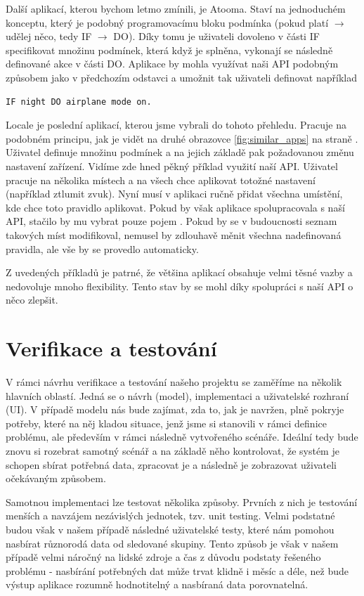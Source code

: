 \documentclass[thesis=M,czech]{FITthesis}[2012/06/26]
\begin{document}
Další aplikací, kterou bychom letmo zmínili, je Atooma\cite{atooma}. Staví na jednoduchém konceptu, který je podobný programovacímu bloku podmínka (pokud platí $\rightarrow$ udělej něco, tedy IF $\rightarrow$ DO). Díky tomu je uživateli dovoleno v části IF specifikovat množinu podmínek, která když je splněna, vykonají se následně definované akce v části DO. Aplikace by mohla využívat naši API podobným způsobem jako v předchozím odstavci a umožnit tak uživateli definovat například

\begin{verbatim}
IF night DO airplane mode on.
\end{verbatim}

Locale\cite{locale} je poslední aplikací, kterou jsme vybrali do tohoto přehledu. Pracuje na podobném principu, jak je vidět na druhé obrazovce \ref{fig:similar_apps} na straně \pageref{fig:similar_apps}. Uživatel definuje množinu podmínek a na jejich základě pak požadovanou změnu nastavení zařízení. Vidíme zde hned pěkný příklad využití naší API. Uživatel pracuje na několika místech a na všech chce aplikovat totožné nastavení (například ztlumit zvuk). Nyní musí v aplikaci ručně přidat všechna umístění, kde chce toto pravidlo aplikovat. Pokud by však aplikace spolupracovala s naší API, stačilo by mu vybrat pouze pojem . Pokud by se v budoucnosti seznam takových míst modifikoval, nemusel by zdlouhavě měnit všechna nadefinovaná pravidla, ale vše by se provedlo automaticky.

Z uvedených příkladů je patrné, že většina aplikací obsahuje velmi těsné vazby a nedovoluje mnoho flexibility. Tento stav by se mohl díky spolupráci s naší API o něco zlepšit.

\section{Verifikace a testování}
V rámci návrhu verifikace a testování našeho projektu se zaměříme na několik hlavních oblastí. Jedná se o návrh (model), implementaci a uživatelské rozhraní (UI). V případě modelu nás bude zajímat, zda to, jak je navržen, plně pokryje potřeby, které na něj kladou situace, jenž jsme si stanovili v rámci definice problému, ale především v rámci následně vytvořeného scénáře. Ideální tedy bude znovu si rozebrat samotný scénář a na základě něho kontrolovat, že systém je schopen sbírat potřebná data, zpracovat je a následně je zobrazovat uživateli očekávaným způsobem.

Samotnou implementaci lze testovat několika způsoby. Prvních z nich je testování menších a navzájem nezávislých jednotek, tzv. unit testing. Velmi podstatné budou však v našem případě následné uživatelské testy, které nám pomohou nasbírat různorodá data od sledované skupiny. Tento způsob je však v našem případě velmi náročný na lidské zdroje a čas z důvodu podstaty řešeného problému - nasbírání potřebných dat může trvat klidně i měsíc a déle, než bude výstup aplikace rozumně hodnotitelný a nasbíraná data porovnatelná.
\end{document}
